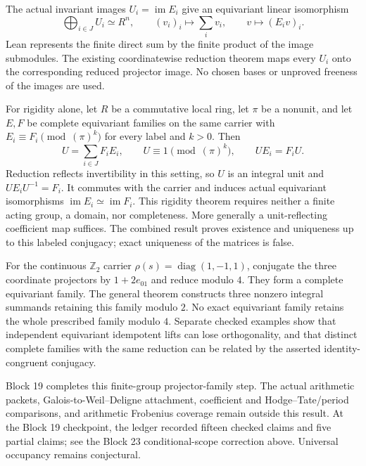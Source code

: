 \documentclass[11pt]{article}
\theoremstyle{definition}
\theoremstyle{remark}
\begin{document}
The actual invariant images $U_i=\operatorname{im}E_i$ give an equivariant
linear isomorphism
\[
\bigoplus_{i\in J}U_i\simeq R^n,
\qquad (v_i)_i\longmapsto\sum_i v_i,
\qquad v\longmapsto(E_iv)_i.
\]
Lean represents the finite direct sum by the finite product of the image
submodules. The existing coordinatewise reduction theorem maps every
$U_i$ onto the corresponding reduced projector image. No chosen bases or
unproved freeness of the images are used.

For rigidity alone, let $R$ be a commutative local ring, let $\pi$ be a
nonunit, and let $E,F$ be complete equivariant families on the same carrier
with $E_i\equiv F_i\pmod{(\pi)^k}$ for every label and $k>0$. Then
\[
U=\sum_{i\in J}F_iE_i,\qquad
U\equiv1\pmod{(\pi)^k},\qquad UE_i=F_iU.
\]
Reduction reflects invertibility in this setting, so $U$ is an integral
unit and $UE_iU^{-1}=F_i$. It commutes with the carrier and induces actual
equivariant isomorphisms $\operatorname{im}E_i\simeq\operatorname{im}F_i$.
This rigidity theorem requires neither a finite acting group, a domain,
nor completeness. More generally a unit-reflecting coefficient map suffices.
The combined result proves existence and uniqueness up to this labeled
conjugacy; exact uniqueness of the matrices is false.

For the continuous $\mathbb Z_2$ carrier
$\rho(s)=\operatorname{diag}(1,-1,1)$, conjugate the three coordinate
projectors by $1+2e_{01}$ and reduce modulo $4$. They form a complete
equivariant family. The general theorem constructs three nonzero integral
summands retaining this family modulo $2$. No exact equivariant family
retains the whole prescribed family modulo $4$. Separate checked examples
show that independent equivariant idempotent lifts can lose orthogonality,
and that distinct complete families with the same reduction can be related
by the asserted identity-congruent conjugacy.

Block 19 completes this finite-group projector-family step. The actual
arithmetic packets, Galois-to-Weil--Deligne attachment, coefficient and
Hodge--Tate/period comparisons, and arithmetic Frobenius coverage remain
outside this result. At the Block 19 checkpoint, the ledger recorded fifteen
checked claims and five partial claims; see the Block 23 conditional-scope
correction above. Universal occupancy remains conjectural.
\end{document}

